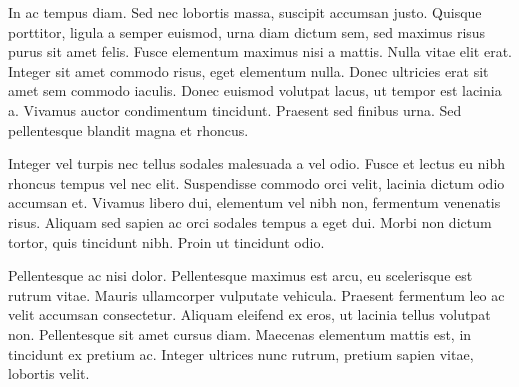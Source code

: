 \documentclass[10pt, a4paper, twocolumn]{article} %
\begin{document}
In ac tempus diam. Sed nec lobortis massa, suscipit accumsan justo. Quisque porttitor, ligula a semper euismod, urna diam dictum sem, sed maximus risus purus sit amet felis. Fusce elementum maximus nisi a mattis. Nulla vitae elit erat. Integer sit amet commodo risus, eget elementum nulla. Donec ultricies erat sit amet sem commodo iaculis. Donec euismod volutpat lacus, ut tempor est lacinia a. Vivamus auctor condimentum tincidunt. Praesent sed finibus urna. Sed pellentesque blandit magna et rhoncus.

Integer vel turpis nec tellus sodales malesuada a vel odio. Fusce et lectus eu nibh rhoncus tempus vel nec elit. Suspendisse commodo orci velit, lacinia dictum odio accumsan et. Vivamus libero dui, elementum vel nibh non, fermentum venenatis risus. Aliquam sed sapien ac orci sodales tempus a eget dui. Morbi non dictum tortor, quis tincidunt nibh. Proin ut tincidunt odio.

Pellentesque ac nisi dolor. Pellentesque maximus est arcu, eu scelerisque est rutrum vitae. Mauris ullamcorper vulputate vehicula. Praesent fermentum leo ac velit accumsan consectetur. Aliquam eleifend ex eros, ut lacinia tellus volutpat non. Pellentesque sit amet cursus diam. Maecenas elementum mattis est, in tincidunt ex pretium ac. Integer ultrices nunc rutrum, pretium sapien vitae, lobortis velit.


\printbibliography[title={References}] %

\end{document}
